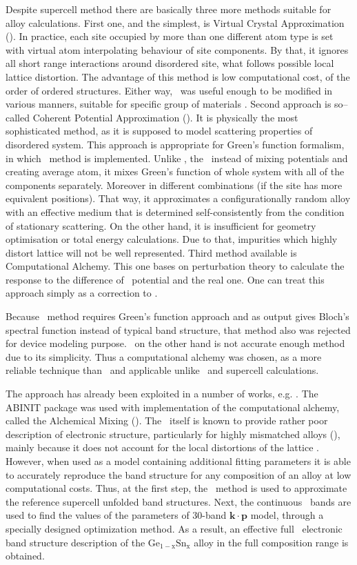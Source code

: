 Despite supercell method there are basically three more methods suitable for alloy calculations.
First one, and the simplest, is Virtual Crystal Approximation \cite{vca1} (\VCA).
In practice, each site occupied by more than one different atom type is set with virtual atom interpolating behaviour of site components.
By that, it ignores all short range interactions around disordered site, what follows possible local lattice distortion.
The advantage of this method is low computational cost, of the order of ordered structures.
Either way, \VCA\ was useful enough to be modified in various manners, suitable for specific group of materials \cite{vca_mod1,vca_mod2}.
Second approach is so--called Coherent Potential Approximation (\CPA).
It is physically the most sophisticated method, as it is supposed to model scattering properties of disordered system.
This approach is appropriate for Green's function formalism, in which \KKR\ method is implemented.
Unlike \VCA, the \CPA\ instead of mixing potentials and creating average atom, it mixes Green's function of whole system with all of the components separately.
Moreover in different combinations (if the site has more equivalent positions).
That way, it  approximates a configurationally random alloy with an effective medium that is determined self-consistently from the condition of stationary scattering.
On the other hand, it is insufficient for geometry optimisation or total energy calculations.
Due to that, impurities which highly distort lattice will not be well represented.
Third method available is Computational Alchemy.
This one bases on perturbation theory to calculate the response to the difference of \VCA\ potential and the real one.
One can treat this approach simply as a correction to \VCA.

Because \CPA\ method requires Green's function approach and as output gives Bloch's spectral function instead of typical band structure, that method also was rejected for device modeling purpose.
\VCA\ on the other hand is not accurate enough method due to its simplicity.
Thus a computational alchemy was chosen, as a more reliable technique than \VCA\ and applicable unlike \CPA\ and supercell calculations.

The approach has already been exploited in a number of works, e.g. \cite{ingap_alch,gesi_mc_alch,alloys_alch,vca}.
The ABINIT package was used with implementation of the computational alchemy, called the Alchemical Mixing (\AM).
The \AM\ itself is known to provide rather poor description of electronic structure, particularly for highly mismatched alloys (\HMA), mainly because it does not account for the local distortions of the lattice \cite{ingan}.
However, when used as a model containing additional fitting parameters it is able to accurately reproduce the band structure for any composition of an alloy at low computational costs.
Thus, at the first step, the \AM\ method is used to approximate the reference supercell unfolded band structures.
Next, the continuous \AM\ bands are used to find the values of the parameters of 30-band $\mathbf{k}\cdot\mathbf{p}$ model, through a specially designed optimization method.
As a result, an effective full \BZ\ electronic band structure description of the $\mathrm{Ge_{1-x}Sn_x}$ alloy in the full composition range is obtained.

